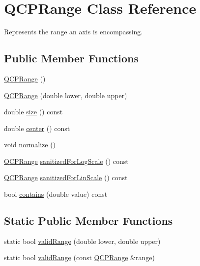 \hypertarget{classQCPRange}{\section{Q\-C\-P\-Range Class Reference}
\label{classQCPRange}
}


Represents the range an axis is encompassing.  


\subsection*{Public Member Functions}
\begin{DoxyCompactItemize}
\item 
\hyperlink{classQCPRange_aca158d7e69702cee5d77d10a269b01e2}{Q\-C\-P\-Range} ()
\item 
\hyperlink{classQCPRange_a1d9d84d084c8f368fdedd42e0978d405}{Q\-C\-P\-Range} (double lower, double upper)
\item 
double \hyperlink{classQCPRange_afa57c13049b965edb6fd1c00ac56338a}{size} () const 
\item 
double \hyperlink{classQCPRange_a3825b53cf17da5de0843c1f3baad07db}{center} () const 
\item 
void \hyperlink{classQCPRange_af914a7740269b0604d0827c634a878a9}{normalize} ()
\item 
\hyperlink{classQCPRange}{Q\-C\-P\-Range} \hyperlink{classQCPRange_aaf6a9046e78d91eeb8e89584fe46b034}{sanitized\-For\-Log\-Scale} () const 
\item 
\hyperlink{classQCPRange}{Q\-C\-P\-Range} \hyperlink{classQCPRange_a1ff029704c29a75adbc1dc36cecaf44c}{sanitized\-For\-Lin\-Scale} () const 
\item 
bool \hyperlink{classQCPRange_a030ce95b527c32e01414d0351347b46d}{contains} (double value) const 
\end{DoxyCompactItemize}
\subsection*{Static Public Member Functions}
\begin{DoxyCompactItemize}
\item 
static bool \hyperlink{classQCPRange_ab38bd4841c77c7bb86c9eea0f142dcc0}{valid\-Range} (double lower, double upper)
\item 
static bool \hyperlink{classQCPRange_a801b964752eaad6219be9d8a651ec2b3}{valid\-Range} (const \hyperlink{classQCPRange}{Q\-C\-P\-Range} \&range)
\end{DoxyCompactItemize}
